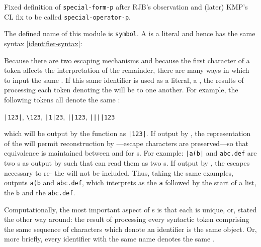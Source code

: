 \label{symbol}
%
\begin{optPrivate}
    Fixed definition of {\tt special-form-p} after RJB's observation and (later)
    KMP's CL fix to be called {\tt special-operator-p}.
\end{optPrivate}
%
\begin{optDefinition}
The defined name of this module is {\tt symbol}.
%
%
A  is a literal  and hence has the same syntax
\ref{identifier-syntax}:

\Syntax
\label{symbol-syntax}
%
%

Because there are two escaping mechanisms and because the first character of a
token affects the interpretation of the remainder, there are many ways in which
to input the same .  If this same identifier is used as a
literal, \ie a , the results of processing each token denoting the
 will be  to one another.  For example, the
following tokens all denote the same :
%
\begin{center}
\verb+|123|+, \verb+\123+, \verb+|1|23+, \verb+||123+, \verb+||||123+
\end{center}
%
which will be output by the function  as \verb+|123|+.  If
output by , the representation of the  will
permit reconstruction by ---escape characters are
preserved---so that equivalence is maintained between  and
 for s.  For example: \verb+|a(b|+ and
\verb+abc.def+ are two s as output by  such
that  can read them as two s.  If output by
, the escapes necessary to re- the
 will not be included.  Thus, taking the same examples,
 outputs \verb+a(b+ and \verb+abc.def+, which
 interprets as the  \verb+a+ followed by the
start of a list, the  \verb+b+ and the 
\verb+abc.def+.

Computationally, the most important aspect of s is that each is
unique, or, stated the other way around: the result of processing
every syntactic token comprising the same sequence of characters which
denote an identifier is the same object.  Or, more briefly, every
identifier with the same name denotes the same .


\end{optDefinition}
